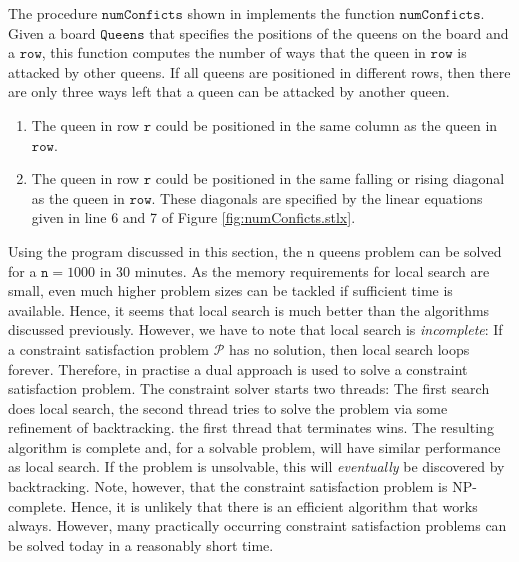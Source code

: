 The procedure $\mathtt{numConficts}$ shown in  implements the function
$\mathtt{numConficts}$.  Given a board $\mathtt{Queens}$ that specifies the positions of the queens on the
board and a $\mathtt{row}$, this function computes the number of ways that the queen in $\mathtt{row}$ is
attacked by other queens.  If all queens are positioned in different rows, then there are only three ways left
that a queen can be attacked by another queen.
\begin{enumerate}
\item The queen in row $\mathtt{r}$ could be positioned in the same column as the queen in $\mathtt{row}$.
\item The queen in row $\mathtt{r}$ could be positioned in the same falling or rising diagonal as the queen in
      $\mathtt{row}$.  These diagonals are specified by the linear equations given in line 6 and 7 of Figure
      \ref{fig:numConficts.stlx}.
\end{enumerate}
Using the program discussed in this section, the n queens problem can be solved for a $\mathtt{n} = 1000$ in
30 minutes.  As the memory requirements for local search are small, even much higher problem sizes can be
tackled if sufficient time is available.  Hence, it seems that local search is much better than the algorithms
discussed previously.  However, we have to note that local search is \emph{\color{blue}incomplete}:  If a
constraint satisfaction problem $\mathcal{P}$ has no solution, then local search loops forever.  Therefore, in
practise a dual approach is used to solve a constraint satisfaction problem.  The constraint solver starts two
threads: The first search does local search, the second thread tries to solve the problem via some refinement
of backtracking.  the first thread that terminates wins.  The resulting algorithm is complete and, for a
solvable problem, will have similar performance as local search.  If the problem is unsolvable, this will
\emph{\color{blue}eventually} be discovered by backtracking.  Note, however, that the constraint satisfaction
problem is NP-complete.  Hence, it is unlikely that there is an efficient algorithm that works always.
However, many practically occurring constraint satisfaction problems can be solved today in a reasonably short
time. 

